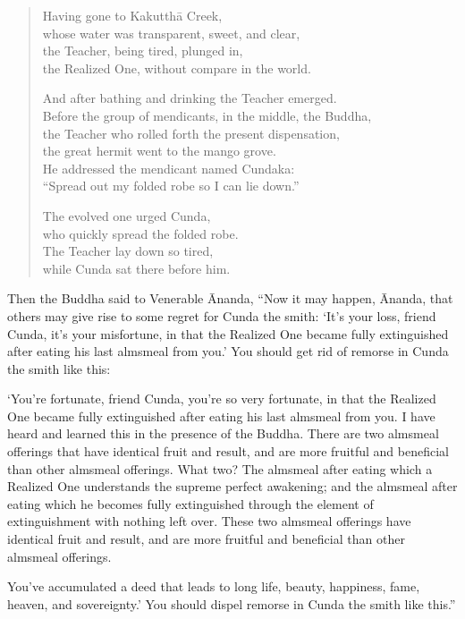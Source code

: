 \documentclass[12pt,openany]{book}%
\begin{document}
\begin{verse}%
Having gone to \textsanskrit{Kakutthā} Creek, \\
whose water was transparent, sweet, and clear, \\
the Teacher, being tired, plunged in, \\
the Realized One, without compare in the world. 

And after bathing and drinking the Teacher emerged. \\
Before the group of mendicants, in the middle, the Buddha, \\
the Teacher who rolled forth the present dispensation, \\
the great hermit went to the mango grove. \\
He addressed the mendicant named Cundaka: \\
“Spread out my folded robe so I can lie down.” 

The evolved one urged Cunda, \\
who quickly spread the folded robe. \\
The Teacher lay down so tired, \\
while Cunda sat there before him. 

%
\end{verse}

Then the Buddha said to Venerable Ānanda, “Now it may happen, Ānanda, that others may give rise to some regret for Cunda the smith: ‘It’s your loss, friend Cunda, it’s your misfortune, in that the Realized One became fully extinguished after eating his last almsmeal from you.’ You should get rid of remorse in Cunda the smith like this: 

‘You’re fortunate, friend Cunda, you’re so very fortunate, in that the Realized One became fully extinguished after eating his last almsmeal from you. I have heard and learned this in the presence of the Buddha. There are two almsmeal offerings that have identical fruit and result, and are more fruitful and beneficial than other almsmeal offerings. What two? The almsmeal after eating which a Realized One understands the supreme perfect awakening; and the almsmeal after eating which he becomes fully extinguished through the element of extinguishment with nothing left over. These two almsmeal offerings have identical fruit and result, and are more fruitful and beneficial than other almsmeal offerings. 

You’ve accumulated a deed that leads to long life, beauty, happiness, fame, heaven, and sovereignty.’ You should dispel remorse in Cunda the smith like this.” 
\end{document}
